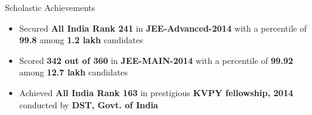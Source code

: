 \documentclass{resume}
\newcommand{\sepval}{-0.5em}
\begin{document}

\vspace{3.5cm}

\renewcommand\labelitemi{\raisebox{0.45ex}{\tiny$\bullet$}}

\begin{rSection}{Scholastic Achievements}

\begin{itemize}[leftmargin=*]
	
	\itemsep \sepval

	\item Secured {\bf All India Rank 241} in {\bf JEE-Advanced-2014} with a percentile of {\bf 99.8} among {\bf 1.2 lakh} candidates
	
	\item Scored {\bf 342 out of 360} in {\bf JEE-MAIN-2014} with a percentile of {\bf 99.92} among {\bf 12.7 lakh} candidates

	
	\item  Achieved {\bf All India Rank 163} in prestigious {\bf KVPY fellowship, 2014} conducted by {\bf DST, Govt. of India}

	
	
\end{itemize}

\end{rSection}

\end{document}
